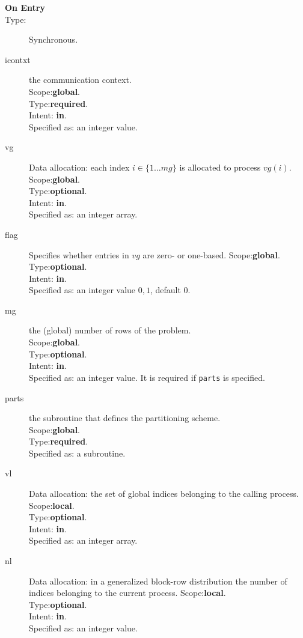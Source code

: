 \begin{description}
\item[\bf  On Entry ]
\item[Type:] Synchronous.
\item[icontxt] the communication context.\\
Scope:{\bf global}.\\
Type:{\bf required}.\\
Intent: {\bf in}.\\
Specified as: an integer value.
\item[vg] Data allocation: each index $i\in \{1\dots mg\}$ is allocated
  to process $vg(i)$.
Scope:{\bf global}.\\
Type:{\bf optional}.\\
Intent: {\bf in}.\\
Specified as: an integer array. 
\item[flag] Specifies whether entries in $vg$ are zero- or one-based.
Scope:{\bf global}.\\
Type:{\bf optional}.\\
Intent: {\bf in}.\\
Specified as: an integer value $0,1$, default $0$.

\item[mg] the (global) number of rows of the problem.\\
Scope:{\bf global}.\\
Type:{\bf optional}.\\
Intent: {\bf in}.\\
Specified as: an integer value. It is required if \verb|parts| is
specified. 
\item[parts] the subroutine that defines the partitioning scheme.\\
Scope:{\bf global}.\\
Type:{\bf required}.\\
Specified as: a subroutine. 
\item[vl] Data allocation: the set of global indices belonging to the
  calling process. 
Scope:{\bf local}.\\
Type:{\bf optional}.\\
Intent: {\bf in}.\\
Specified as: an integer array. 
\item[nl] Data allocation: in a generalized block-row distribution the
  number of indices belonging to the current process. 
Scope:{\bf local}.\\
Type:{\bf optional}.\\
Intent: {\bf in}.\\
Specified as: an integer value. 
\end{description}

